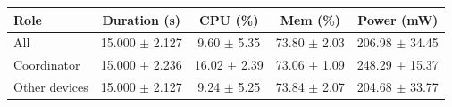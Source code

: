 \begin{tabular}{lcccc}
\hline
\textbf{Role} & \textbf{Duration (s)} & \textbf{CPU (\%)} & \textbf{Mem (\%)} & \textbf{Power (mW)} \\
\hline
All & 15.000 $\pm$ 2.127 & 9.60 $\pm$ 5.35 & 73.80 $\pm$ 2.03 & 206.98 $\pm$ 34.45 \\
Coordinator & 15.000 $\pm$ 2.236 & 16.02 $\pm$ 2.39 & 73.06 $\pm$ 1.09 & 248.29 $\pm$ 15.37 \\
Other devices & 15.000 $\pm$ 2.127 & 9.24 $\pm$ 5.25 & 73.84 $\pm$ 2.07 & 204.68 $\pm$ 33.77 \\
\hline
\end{tabular}
